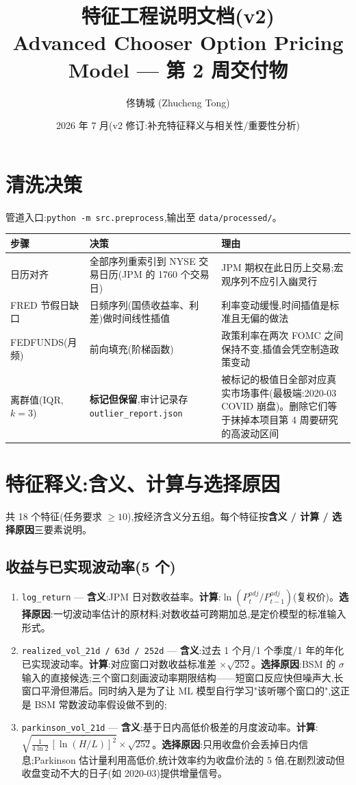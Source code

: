 \documentclass[11pt]{ctexart}
\title{\textbf{特征工程说明文档(v2)}\\
\large Advanced Chooser Option Pricing Model --- 第 2 周交付物}
\author{佟铸城 (Zhucheng Tong)}
\date{2026 年 7 月(v2 修订:补充特征释义与相关性/重要性分析)}
\begin{document}
\maketitle

\section{清洗决策}
管道入口:\texttt{python -m src.preprocess},输出至 \texttt{data/processed/}。

\begin{center}
\small
\begin{tabular}{p{3.2cm} p{4.6cm} p{6.0cm}}
\toprule
\textbf{步骤} & \textbf{决策} & \textbf{理由} \\
\midrule
日历对齐 & 全部序列重索引到 NYSE 交易日历(JPM 的 1760 个交易日) & JPM 期权在此日历上交易;宏观序列不应引入幽灵行 \\
FRED 节假日缺口 & 日频序列(国债收益率、利差)做时间线性插值 & 利率变动缓慢,时间插值是标准且无偏的做法 \\
FEDFUNDS(月频) & 前向填充(阶梯函数) & 政策利率在两次 FOMC 之间保持不变,插值会凭空制造政策变动 \\
离群值(IQR, $k=3$) & \textbf{标记但保留},审计记录存 \texttt{outlier\_report.json} & 被标记的极值日全部对应真实市场事件(最极端:2020-03 COVID 崩盘)。删除它们等于抹掉本项目第 4 周要研究的高波动区间 \\
\bottomrule
\end{tabular}
\end{center}

\section{特征释义:含义、计算与选择原因}
共 18 个特征(任务要求 $\geq 10$),按经济含义分五组。每个特征按\textbf{含义 / 计算 / 选择原因}三要素说明。

\subsection{收益与已实现波动率(5 个)}
\begin{enumerate}
  \item \texttt{log\_return} --- \textbf{含义}:JPM 日对数收益率。\textbf{计算}:$\ln(P^{adj}_t/P^{adj}_{t-1})$(复权价)。\textbf{选择原因}:一切波动率估计的原材料;对数收益可跨期加总,是定价模型的标准输入形式。
  \item \texttt{realized\_vol\_21d / 63d / 252d} --- \textbf{含义}:过去 1 个月/1 个季度/1 年的年化已实现波动率。\textbf{计算}:对应窗口对数收益标准差 $\times\sqrt{252}$。\textbf{选择原因}:BSM 的 $\sigma$ 输入的直接候选;三个窗口刻画波动率期限结构——短窗口反应快但噪声大,长窗口平滑但滞后。同时纳入是为了让 ML 模型自行学习"该听哪个窗口的",这正是 BSM 常数波动率假设做不到的;
  \item \texttt{parkinson\_vol\_21d} --- \textbf{含义}:基于日内高低价极差的月度波动率。\textbf{计算}:$\sqrt{\frac{1}{4\ln 2}\,\overline{[\ln(H/L)]^2}}\times\sqrt{252}$。\textbf{选择原因}:只用收盘价会丢掉日内信息;Parkinson 估计量利用高低价,统计效率约为收盘价法的 5 倍,在剧烈波动但收盘变动不大的日子(如 2020-03)提供增量信号。
\end{enumerate}
\end{document}
